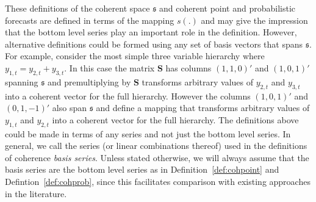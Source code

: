\documentclass[a4paper, 11pt]{article}
\theoremstyle{theo}
\theoremstyle{definition}
\begin{document}



These definitions of the coherent space $\mathfrak{s}$ and coherent point and probabilistic forecasts are defined in terms of the mapping $s(.)$ and may give the impression that the bottom level series play an important role in the definition.  However, alternative definitions could be formed using any set of basis vectors that spans $\mathfrak{s}$. For example, consider the most simple three variable hierarchy where $y_{1,t}=y_{2,t}+y_{3,t}$.  In this case the matrix $\bm{S}$ has columns  $(1,1,0)'$ and $(1,0,1)'$ spanning $\mathfrak{s}$ and premultiplying by $\bm{S}$ transforms arbitrary values of $y_{2,t}$ and $y_{3,t}$ into a coherent vector for the full hierarchy.  However the columns $(1,0,1)'$ and $(0,1,-1)'$ also span $\mathfrak{s}$ and define a mapping that transforms arbitrary values of $y_{1,t}$ and $y_{2,t}$ into a coherent vector for the full hierarchy.  The definitions above could be made in terms of any series and not just the bottom level series.  In general, we call the series (or linear combinations thereof) used in the definitions of coherence \textit{basis series}.  Unless stated otherwise, we will always assume that the basis series are the bottom level series as in Definition~\ref{def:cohpoint} and Defintion~\ref{def:cohprob}, since this facilitates comparison with existing approaches in the literature.
\end{document}
